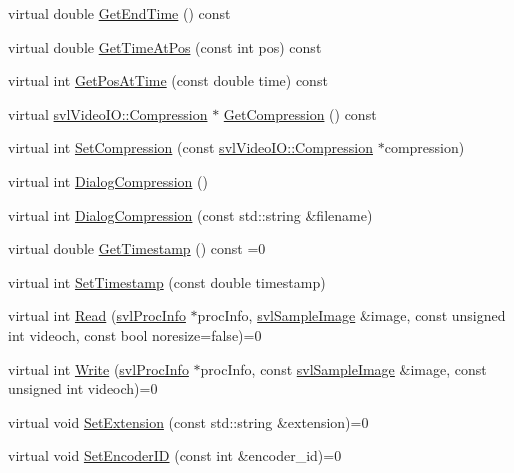 \begin{DoxyCompactItemize}
\item 
virtual double \hyperlink{classsvl_video_codec_base_ae37d3dfad14b32b91142a47aa8d6deb7}{Get\+End\+Time} () const 
\item 
virtual double \hyperlink{classsvl_video_codec_base_a3395c666fc3b62dd08fe58532b0276e3}{Get\+Time\+At\+Pos} (const int pos) const 
\item 
virtual int \hyperlink{classsvl_video_codec_base_aba3f60a59e783830698e665463a37877}{Get\+Pos\+At\+Time} (const double time) const 
\item 
virtual \hyperlink{classsvl_video_i_o_a932d071ec9be4fefde824ab9b9125282}{svl\+Video\+I\+O\+::\+Compression} $\ast$ \hyperlink{classsvl_video_codec_base_a72a3be58ffdd9a51913e82669a17ee1e}{Get\+Compression} () const 
\item 
virtual int \hyperlink{classsvl_video_codec_base_a0359425dc3b7c3c8c3f711d1dba3a7fa}{Set\+Compression} (const \hyperlink{classsvl_video_i_o_a932d071ec9be4fefde824ab9b9125282}{svl\+Video\+I\+O\+::\+Compression} $\ast$compression)
\item 
virtual int \hyperlink{classsvl_video_codec_base_a502611c3f724f1a223d5ef53df5e943e}{Dialog\+Compression} ()
\item 
virtual int \hyperlink{classsvl_video_codec_base_a84975b656e19b551faaa3e897ab81477}{Dialog\+Compression} (const std\+::string \&filename)
\item 
virtual double \hyperlink{classsvl_video_codec_base_a83c414ebdfd4b3357ab13d7250fce399}{Get\+Timestamp} () const =0
\item 
virtual int \hyperlink{classsvl_video_codec_base_ad68fc7c2e3b15c28d115a9035430efa1}{Set\+Timestamp} (const double timestamp)
\item 
virtual int \hyperlink{classsvl_video_codec_base_a5080f4cb4c4e4080c597c08e7b4bea9e}{Read} (\hyperlink{structsvl_proc_info}{svl\+Proc\+Info} $\ast$proc\+Info, \hyperlink{classsvl_sample_image}{svl\+Sample\+Image} \&image, const unsigned int videoch, const bool noresize=false)=0
\item 
virtual int \hyperlink{classsvl_video_codec_base_ad5f3ac2784f190ecd2c41b8ea403d670}{Write} (\hyperlink{structsvl_proc_info}{svl\+Proc\+Info} $\ast$proc\+Info, const \hyperlink{classsvl_sample_image}{svl\+Sample\+Image} \&image, const unsigned int videoch)=0
\item 
virtual void \hyperlink{classsvl_video_codec_base_af44ab8df3791970cdffea982ac18562a}{Set\+Extension} (const std\+::string \&extension)=0
\item 
virtual void \hyperlink{classsvl_video_codec_base_a80937488260c66e7f323798de456381e}{Set\+Encoder\+I\+D} (const int \&encoder\+\_\+id)=0

\end{DoxyCompactItemize}
